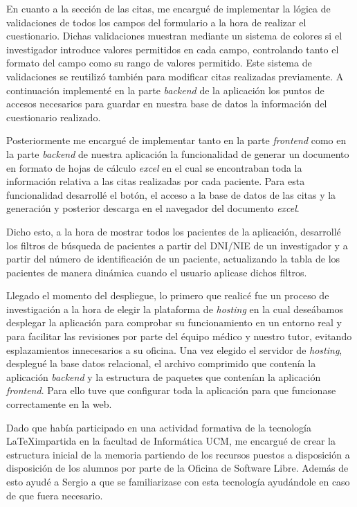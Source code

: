 En cuanto a la sección de las citas, me encargué de implementar la lógica de validaciones de todos los campos del formulario a la hora de realizar el cuestionario. Dichas validaciones muestran mediante un sistema de colores si el investigador introduce valores permitidos en cada campo, controlando tanto el formato del campo como su rango de valores permitido. Este sistema de validaciones se reutilizó también para modificar citas realizadas previamente. A continuación implementé en la parte \textit{backend} de la aplicación los puntos de accesos necesarios para guardar en nuestra base de datos la información  del cuestionario realizado. \newline

Posteriormente me encargué de implementar tanto en la parte \textit{frontend} como en la parte \textit{backend} de nuestra aplicación la funcionalidad de generar un documento en formato de hojas de cálculo \textit{excel} en el cual se encontraban toda la información relativa a las citas realizadas por cada paciente. Para esta funcionalidad desarrollé el botón, el acceso a la base de datos de las citas y la generación y posterior descarga en el navegador del documento \textit{excel}. \newline

Dicho esto, a la hora de mostrar todos los pacientes de la aplicación, desarrollé los filtros de búsqueda de pacientes a partir del DNI/NIE de un investigador y a partir del número de identificación de un paciente, actualizando la tabla de los pacientes de manera dinámica cuando el usuario aplicase dichos filtros. \newline

Llegado el momento del despliegue, lo primero que realicé fue un proceso de investigación a la hora de elegir la plataforma de \textit{hosting} en la cual deseábamos desplegar la aplicación para comprobar su funcionamiento en un entorno real y para facilitar las revisiones por parte del équipo médico y nuestro tutor, evitando esplazamientos innecesarios a su oficina. Una vez elegido el servidor de \textit{hosting}, desplegué la base datos relacional, el archivo comprimido que contenía la aplicación \textit{backend} y la estructura de paquetes que contenían la aplicación \textit{frontend}. Para ello tuve que configurar toda la aplicación para que funcionase correctamente en la web. \newline

Dado que había participado en una actividad formativa de la tecnología \LaTeX   impartida en la facultad de Informática UCM, me encargué de crear la estructura inicial de la memoria partiendo de los recursos puestos a disposición a disposición de los alumnos por parte de la Oficina de Software Libre. Además de esto ayudé a Sergio  a que se familiarizase con esta tecnología ayudándole en caso de que fuera necesario. \newline







